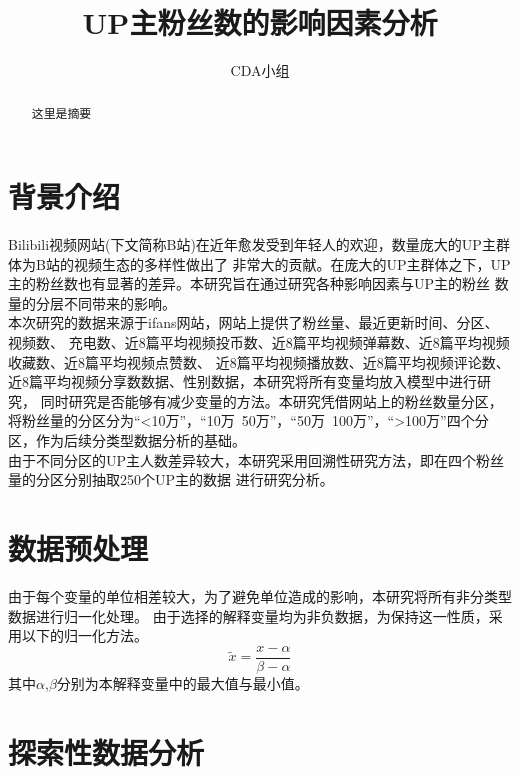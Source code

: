 \documentclass{ctexart}
\title{UP主粉丝数的影响因素分析}
\author{CDA小组}
\date{}
\begin{document}
\maketitle
\begin{abstract}
    这里是摘要
\end{abstract}
\section{背景介绍}
Bilibili视频网站(下文简称B站)在近年愈发受到年轻人的欢迎，数量庞大的UP主群体为B站的视频生态的多样性做出了
非常大的贡献。在庞大的UP主群体之下，UP主的粉丝数也有显著的差异。本研究旨在通过研究各种影响因素与UP主的粉丝
数量的分层不同带来的影响。\\
\indent 本次研究的数据来源于ifans网站，网站上提供了粉丝量、最近更新时间、分区、视频数、
充电数、近8篇平均视频投币数、近8篇平均视频弹幕数、近8篇平均视频收藏数、近8篇平均视频点赞数、
近8篇平均视频播放数、近8篇平均视频评论数、近8篇平均视频分享数数据、性别数据，本研究将所有变量均放入模型中进行研究，
同时研究是否能够有减少变量的方法。本研究凭借网站上的粉丝数量分区，
将粉丝量的分区分为“<10万”，“10万~50万”，“50万~100万”，“>100万”四个分区，作为后续分类型数据分析的基础。\\
\indent 由于不同分区的UP主人数差异较大，本研究采用回溯性研究方法，即在四个粉丝量的分区分别抽取250个UP主的数据
进行研究分析。
\section{数据预处理}
由于每个变量的单位相差较大，为了避免单位造成的影响，本研究将所有非分类型数据进行归一化处理。
由于选择的解释变量均为非负数据，为保持这一性质，采用以下的归一化方法。
\begin{equation}
    \tilde{x} = \frac{x-\alpha}{\beta - \alpha}
\end{equation}
其中$\alpha$,$\beta$分别为本解释变量中的最大值与最小值。
\section{探索性数据分析}
\end{document}
